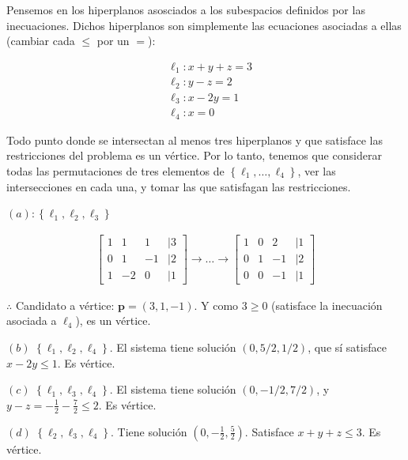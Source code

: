 \documentclass[12pt]{article}
\begin{document}
Pensemos en los hiperplanos asosciados a los subespacios definidos por las
inecuaciones. Dichos hiperplanos son simplemente las ecuaciones asociadas a
ellas (cambiar cada $\leq$ por un $=$): 

\begin{align*}
    &\ell_1 : x + y + z = 3 \\ 
    &\ell_2 : y - z = 2 \\ 
    &\ell_3 : x - 2y = 1 \\ 
    &\ell_4 : x = 0
\end{align*}

Todo punto donde se intersectan al menos tres hiperplanos y que satisface las
restricciones del problema es un vértice. Por lo tanto, tenemos que considerar
todas las permutaciones de tres elementos de $\left\{ \ell_1, \ldots, \ell_4
\right\} $, ver las intersecciones en cada una, y tomar las que satisfagan las
restricciones.

$(a) : \left\{ \ell_1, \ell_2, \ell_3 \right\} $ 

\begin{align*}
    \begin{bmatrix} 
        1 & 1 & 1 &|3 \\ 
        0 & 1 & -1 &|2 \\ 
        1 & -2 & 0 & |1
    \end{bmatrix} \to \ldots \to \begin{bmatrix} 
        1 & 0 & 2 &|1 \\ 
        0 & 1 & -1 & |2 \\ 
        0 & 0 & -1 & |1
    \end{bmatrix} 
\end{align*}

$\therefore $ Candidato a vértice: $\textbf{p} = (3, 1, -1)$. Y como $3 \geq 0$
(satisface la inecuación asociada a $\ell_4$), es un vértice.

$(b)$ $\left\{ \ell_1, \ell_2, \ell_4 \right\} $. El sistema tiene solución $(0, 5
/ 2, 1 /2)$, que sí satisface $x - 2y \leq 1$. Es vértice. 

$(c)$ $\left\{ \ell_1, \ell_3, \ell_4 \right\} $. El sistema tiene solución $(0,
-1/2, 7 / 2)$, y $y - z = -\frac{1}{2} - \frac{7}{2} \leq 2$. Es vértice.

$(d)$ $\left\{ \ell_2, \ell_3, \ell_4 \right\} $. Tiene  solución $(0,
-\frac{1}{2}, \frac{5}{2})$. Satisface $x + y + z \leq 3$. Es vértice.




\pagebreak 
\end{document}
